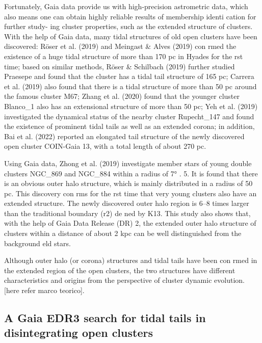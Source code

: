 \documentclass[../main.tex]{subfiles}
\begin{document}
{Fortunately, Gaia data provide us with high-precision
astrometric data, which also means one can obtain highly
reliable results of membership identi cation for further study-
ing cluster properties, such as the extended structure of clusters.
With the help of Gaia data, many tidal structures of old open
clusters have been discovered: Röser et al. (2019) and Meingast
& Alves (2019) con rmed the existence of a huge tidal
structure of more than 170 pc in Hyades for the rst time; based
on similar methods, Röser & Schilbach (2019) further studied
Praesepe and found that the cluster has a tidal tail structure of
165 pc; Carrera et al. (2019) also found that there is a tidal
structure of more than 50 pc around the famous cluster M67;
Zhang et al. (2020) found that the younger cluster Blanco_1
also has an extensional structure of more than 50 pc; Yeh et al.
(2019) investigated the dynamical status of the nearby cluster
Rupecht_147 and found the existence of prominent tidal tails as
well as an extended corona; in addition, Bai et al. (2022)
reported an elongated tail structure of the newly discovered
open cluster COIN-Gaia 13, with a total length of about 270 pc.

Using Gaia data, Zhong et al. (2019) investigate member
stars of young double clusters NGC_869 and NGC_884 within
a radius of 7° . 5. It is found that there is an obvious outer halo
structure, which is mainly distributed in a radius of 50 pc. This
discovery con rms for the rst time that very young clusters
also have an extended structure. The newly discovered outer
halo region is 6–8 times larger than the traditional boundary
(r2) de ned by K13. This study also shows that, with the help
of Gaia Data Release (DR) 2, the extended outer halo structure
of clusters within a distance of about 2 kpc can be well
distinguished from the background eld stars.

Although outer halo (or corona) structures and tidal tails
have been con rmed in the extended region of the open
clusters, the two structures have different characteristics and origins from the perspective of cluster dynamic evolution. [here refer marco teorico].

\subsection{A Gaia EDR3 search for tidal tails in disintegrating open clusters}



}
\end{document}
